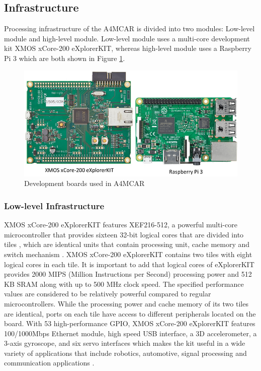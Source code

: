 \subsection{Infrastructure}  %
Processing infrastructure of the A4MCAR is divided into two modules: Low-level module and high-level module. Low-level module uses a multi-core development kit XMOS xCore-200 eXplorerKIT, whereas high-level module uses a Raspberry Pi 3 which are both shown in Figure \ref{fig:boards}.
\begin{figure}[!ht]
	\includegraphics[scale=0.6]{content/images/boards.jpg}
	\caption{Development boards used in A4MCAR}
	\label{fig:boards}
\end{figure}

\subsubsection{Low-level Infrastructure}
XMOS xCore-200 eXplorerKIT features XEF216-512, a powerful multi-core microcontroller that provides sixteen 32-bit logical cores that are divided into tiles \cite{xmoskitweb}, which are identical units that contain processing unit, cache memory and switch mechanism \cite{tileref}. XMOS xCore-200 eXplorerKIT contains two tiles with eight logical cores in each tile. It is important to add that logical cores of eXplorerKIT provides 2000 MIPS (Million Instructions per Second) processing power and 512 KB SRAM along with up to 500 MHz clock speed. The specified performance values are considered to be relatively powerful compared to regular microcontrollers. While the processing power and cache memory of its two tiles are identical, ports on each tile have access to different peripherals located on the board. With 53 high-performance GPIO, XMOS xCore-200 eXplorerKIT features 100/1000Mbps Ethernet module, high speed USB interface, a 3D accelerometer, a 3-axis gyroscope, and six servo interfaces which makes the kit useful in a wide variety of applications that include robotics, automotive, signal processing and communication applications \cite{xmoskitweb}.

